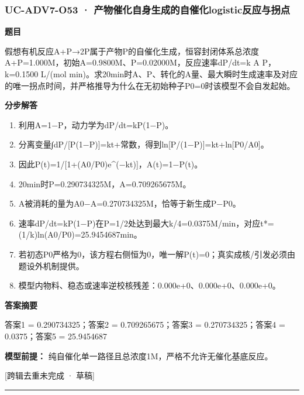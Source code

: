 \documentclass[UTF8,11pt,a4paper]{ctexart}
\begin{document}
\subsubsection*{UC-ADV7-O53 · 产物催化自身生成的自催化logistic反应与拐点}
\noindent\textbf{题目}\par
假想有机反应A+P→2P属于产物P的自催化生成，恒容封闭体系总浓度A+P=1.000M，初始A=0.9800M、P=0.02000M，反应速率dP/dt=k A P，k=0.1500 L/(mol min)。求20min时A、P、转化的A量、最大瞬时生成速率及对应的唯一拐点时间，并严格推导为什么在无初始种子P0=0时该模型不会自发起始。\par
\medskip\noindent\textbf{分步解答}
\begin{enumerate}
\item 利用A=1−P，动力学为dP/dt=kP(1−P)。
\item 分离变量∫dP/[P(1−P)]=kt+常数，得到ln[P/(1−P)]=kt+ln[P0/A0]。
\item 因此P(t)=1/[1+(A0/P0)e\textasciicircum{}(−kt)]，A(t)=1−P(t)。
\item 20min时P=0.290734325M，A=0.709265675M。
\item A被消耗的量为A0−A=0.270734325M，恰等于新生成P−P0。
\item 速率dP/dt=kP(1−P)在P=1/2处达到最大k/4=0.0375M/min，对应t*=(1/k)ln(A0/P0)=25.9454687min。
\item 若初态P0严格为0，该方程右侧恒为0，唯一解P(t)=0；真实成核/引发必须由题设外机制提供。
\item 模型内物料、稳态或速率逆校核残差：0.000e+0、0.000e+0、0.000e+0。
\end{enumerate}
\noindent\textbf{答案摘要}\par
答案1 = 0.290734325；答案2 = 0.709265675；答案3 = 0.270734325；答案4 = 0.0375；答案5 = 25.9454687\par
\noindent\textbf{模型前提：}
纯自催化单一路径且总浓度1M，严格不允许无催化基底反应。\par
\noindent\textcolor{red!65!black}{[跨辑去重未完成 · 草稿]} \par
\medskip\hrule\medskip
{}
\end{document}
